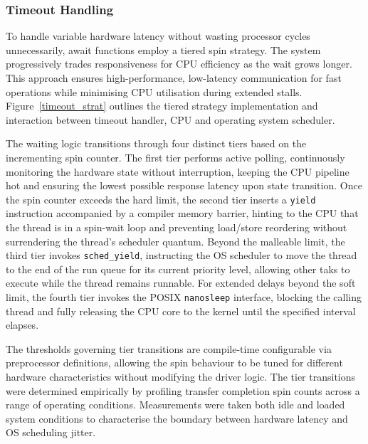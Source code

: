 \documentclass[final]{cmpreport}
\begin{document}


\subsubsection{Timeout Handling}
To handle variable hardware latency without wasting processor cycles unnecessarily, await functions employ a tiered spin strategy. The system progressively trades responsiveness for CPU efficiency as the wait grows longer. This approach ensures high-performance, low-latency communication for fast operations while minimising CPU utilisation during extended stalls. Figure~\ref{timeout_strat} outlines the tiered strategy implementation and interaction between timeout handler, CPU and operating system scheduler.

The waiting logic transitions through four distinct tiers based on the incrementing spin counter. The first tier performs active polling, continuously monitoring the hardware state without interruption, keeping the CPU pipeline hot and ensuring the lowest possible response latency upon state transition. Once the spin counter exceeds the hard limit, the second tier inserts a \texttt{yield} instruction accompanied by a compiler memory barrier, hinting to the CPU that the thread is in a spin-wait loop and preventing load/store reordering without surrendering the thread's scheduler quantum. Beyond the malleable limit, the third tier invokes \texttt{sched\_yield}, instructing the OS scheduler to move the thread to the end of the run queue for its current priority level, allowing other taks to execute while the thread remains runnable. For extended delays beyond the soft limit, the fourth tier invokes the POSIX \texttt{nanosleep} interface, blocking the calling thread and fully releasing the CPU core to the kernel until the specified interval elapses.

The thresholds governing tier transitions are compile-time configurable via preprocessor definitions, allowing the spin behaviour to be tuned for different hardware characteristics without modifying the driver logic. The tier transitions were determined empirically by profiling transfer completion spin counts across a range of operating conditions. Measurements were taken both idle and loaded system conditions to characterise the boundary between hardware latency and OS scheduling jitter.
\end{document}
